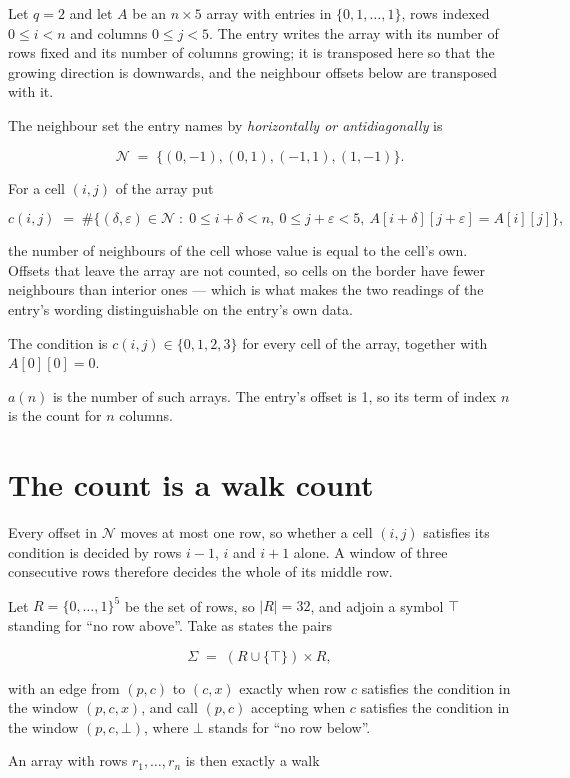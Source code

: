 \documentclass[11pt]{article}
\theoremstyle{definition}
\begin{document}
Let $q = 2$ and let $A$ be an $n \times 5$ array with entries in $\{0,1,\dots,1\}$, rows indexed $0 \le i < n$ and columns $0 \le j < 5$. The entry writes the array with its number of rows fixed and its number of columns growing; it is transposed here so that the growing direction is downwards, and the neighbour offsets below are transposed with it.

The neighbour set the entry names by {\itshape horizontally or antidiagonally} is

\[\mathcal{N} \;=\; \{(0,-1), (0,1), (-1,1), (1,-1)\}.\]

For a cell $(i,j)$ of the array put

\[c(i,j) \;=\; \#\bigl\{(\delta,\varepsilon)\in\mathcal{N} \;:\; 0\le i+\delta<n,\ 0\le j+\varepsilon<5,\ A[i+\delta][j+\varepsilon] = A[i][j]\bigr\},\]

the number of neighbours of the cell whose value is equal to the cell's own. Offsets that leave the array are not counted, so cells on the border have fewer neighbours than interior ones --- which is what makes the two readings of the entry's wording distinguishable on the entry's own data.

The condition is $c(i,j) \in \{0, 1, 2, 3\}$ for every cell of the array, together with $A[0][0]=0$.

$a(n)$ is the number of such arrays. The entry's offset is 1, so its term of index $n$ is the count for $n$ columns.

\section{The count is a walk count}

Every offset in $\mathcal{N}$ moves at most one row, so whether a cell $(i,j)$ satisfies its condition is decided by rows $i-1$, $i$ and $i+1$ alone. A window of three consecutive rows therefore decides the whole of its middle row.

Let $R = \{0,\dots,1\}^{5}$ be the set of rows, so $|R| = 32$, and adjoin a symbol $\top$ standing for ``no row above''. Take as states the pairs

\[\Sigma \;=\; (R \cup \{\top\}) \times R,\]

with an edge from $(p,c)$ to $(c,x)$ exactly when row $c$ satisfies the condition in the window $(p,c,x)$, and call $(p,c)$ accepting when $c$ satisfies the condition in the window $(p,c,\bot)$, where $\bot$ stands for ``no row below''.

An array with rows $r_1,\dots,r_n$ is then exactly a walk
\end{document}

